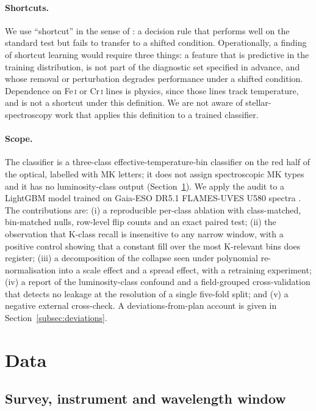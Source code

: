 \documentclass[11pt,a4paper]{article}
\newcommand{\FeI}{Fe\,\textsc{i}\xspace}
\newcommand{\CrI}{Cr\,\textsc{i}\xspace}
\begin{document}
\paragraph{Shortcuts.} We use ``shortcut'' in the sense of \citet{Geirhos2020Shortcut}: a decision rule that performs well on the standard test but fails to transfer to a shifted condition. Operationally, a finding of shortcut learning would require three things: a feature that is predictive in the training distribution, is not part of the diagnostic set specified in advance, and whose removal or perturbation degrades performance under a shifted condition. Dependence on \FeI or \CrI lines is physics, since those lines track temperature, and is not a shortcut under this definition. We are not aware of stellar-spectroscopy work that applies this definition to a trained classifier.

\paragraph{Scope.} The classifier is a three-class effective-temperature-bin classifier on the red half of the optical, labelled with MK letters; it does not assign spectroscopic MK types and it has no luminosity-class output (Section~\ref{sec:data}). We apply the audit to a LightGBM model \citep{Ke2017LightGBM} trained on Gaia-ESO DR5.1 FLAMES-UVES U580 spectra \citep{2022A&A...666A.120G,2022A&A...666A.121R,2014A&A...565A.113S,2023A&A...676A.129H}. The contributions are: (i) a reproducible per-class ablation with class-matched, bin-matched nulls, row-level flip counts and an exact paired test; (ii) the observation that K-class recall is insensitive to any narrow window, with a positive control showing that a constant fill over the most K-relevant bins does register; (iii) a decomposition of the collapse seen under polynomial re-normalisation into a scale effect and a spread effect, with a retraining experiment; (iv) a report of the luminosity-class confound and a field-grouped cross-validation that detects no leakage at the resolution of a single five-fold split; and (v) a negative external cross-check. A deviations-from-plan account is given in Section~\ref{subsec:deviations}.

\section{Data}
\label{sec:data}

\subsection{Survey, instrument and wavelength window}
\end{document}
